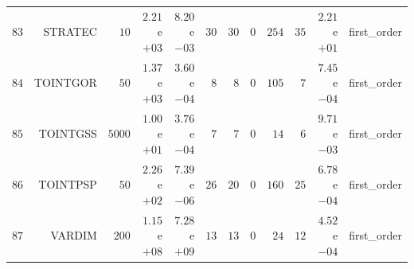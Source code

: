 \begin{longtable}{rrrrrrrrrrrr}
  \(    83\) & STRATEC & \(    10\) & \( 2.21\)e\(+03\) & \( 8.20\)e\(-03\) & \(    30\) & \(    30\) & \(     0\) & \(   254\) & \(    35\) & \( 2.21\)e\(+01\) & first\_order \\
  \(    84\) & TOINTGOR & \(    50\) & \( 1.37\)e\(+03\) & \( 3.60\)e\(-04\) & \(     8\) & \(     8\) & \(     0\) & \(   105\) & \(     7\) & \( 7.45\)e\(-04\) & first\_order \\
  \(    85\) & TOINTGSS & \(  5000\) & \( 1.00\)e\(+01\) & \( 3.76\)e\(-04\) & \(     7\) & \(     7\) & \(     0\) & \(    14\) & \(     6\) & \( 9.71\)e\(-03\) & first\_order \\
  \(    86\) & TOINTPSP & \(    50\) & \( 2.26\)e\(+02\) & \( 7.39\)e\(-06\) & \(    26\) & \(    20\) & \(     0\) & \(   160\) & \(    25\) & \( 6.78\)e\(-04\) & first\_order \\
  \(    87\) & VARDIM & \(   200\) & \( 1.15\)e\(+08\) & \( 7.28\)e\(+09\) & \(    13\) & \(    13\) & \(     0\) & \(    24\) & \(    12\) & \( 4.52\)e\(-04\) & first\_order \\\hline
\end{longtable}
